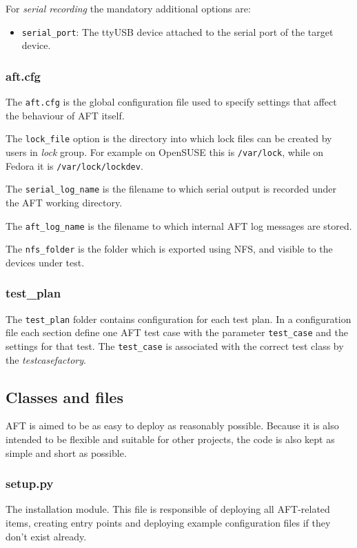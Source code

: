 \documentclass[a4paper,11pt]{article}
\newcommand{\cmd}[1]{\texttt{#1}}
\begin{document}
For \emph{serial recording} the mandatory additional options are:

\begin{itemize}
	\item \cmd{serial\_port}: The ttyUSB device attached to the serial port of the target device.
\end{itemize}

\subsubsection*{aft.cfg}
The \cmd{aft.cfg} is the global configuration file used to specify settings that affect the behaviour of AFT itself.

The \cmd{lock\_file} option is the directory into which lock files can be created by users in \emph{lock} group. For example on OpenSUSE this is \cmd{/var/lock}, while on Fedora it is \cmd{/var/lock/lockdev}.

The \cmd{serial\_log\_name} is the filename to which serial output is recorded under the AFT working directory.

The \cmd{aft\_log\_name} is the filename to which internal AFT log messages are stored.

The \cmd{nfs\_folder} is the folder which is exported using NFS, and visible to the devices under test.

\subsubsection*{test\_plan}
The \cmd{test\_plan} folder contains configuration for each test plan. In a configuration file each section define one AFT test case with the parameter \cmd{test\_case} and the settings for that test. The \cmd{test\_case} is associated with the correct test class by the \emph{testcasefactory}.

\subsection{Classes and files}

AFT is aimed to be as easy to deploy as reasonably possible. Because it is also intended to be flexible and suitable for other projects, the code is also kept as simple and short as possible.

\subsubsection*{setup.py}
The installation module. This file is responsible of deploying all AFT-related items, creating entry points and deploying example configuration files if they don't exist already.
\end{document}
